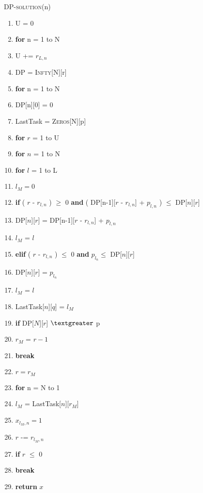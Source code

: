 \documentclass[11pt, oneside]{report}
\begin{document}
\noindent\textsc{DP-solution}(n)
\begin{enumerate}[1\ ]
\setlength{\topsep}{0.05ex}
\setlength{\itemsep}{0.05ex}
\item U = 0
\item \textbf{for} n = 1 to N
\item \qquad U += $r_{L,n}$
\item DP = \textsc{Infty}[N][r]
\item \textbf{for} n = 1 to N
\item \qquad DP[n][0] = 0
\item LastTask = \textsc{Zeros}[N][p]
\item \textbf{for} $r$ = 1 to U
\item \qquad \textbf{for} $n$ = 1 to N
\item \qquad \qquad \textbf{for} $l$ = 1 to L
\item \qquad \qquad \qquad $l_M = 0$
\item \qquad \qquad \qquad \textbf{if} ( $r$ - $r_{l,n}$ ) $\geq$ 0 \textbf{and}  ( DP[n-1][$r$ - $r_{l,n}$] + $p_{l,n}$ ) $\leq$ DP[$n$][$r$]
\item \qquad \qquad \qquad \qquad DP[$n$][$r$] = DP[n-1][$r$ - $r_{l,n}$] + $p_{l,n}$
\item \qquad \qquad \qquad \qquad $l_M$ = $l$
\item \qquad \qquad \qquad \textbf{elif} ( $r$ - $r_{l,n}$ ) $\leq$ 0 \textbf{and} $p_{l_n} \leq$ DP[$n$][$r$]
\item \qquad \qquad \qquad \qquad DP[$n$][$r$] = $p_{l_n}$
\item \qquad \qquad \qquad \qquad $l_M$ = $l$
\item \qquad \qquad LastTask[$n$][$q$] = $l_M$
\item \qquad \textbf{if} DP[$N$][$r$] $\textgreater$ p
\item \qquad \qquad $r_M$ = $r-1$
\item \qquad \qquad \textbf{break}
\item $r = r_M$
\item \textbf{for} n = N to 1
\item \qquad $l_M$ = LastTask[$n$][$r_M$]
\item \qquad $x_{l_M, n} = 1$
\item \qquad $r$ -= $r_{l_M, n}$
\item \qquad \textbf{if} $r$ $\leq$ 0
\item \qquad \qquad \textbf{break}
\item \textbf{return} $x$
\end{enumerate}
\end{document}
